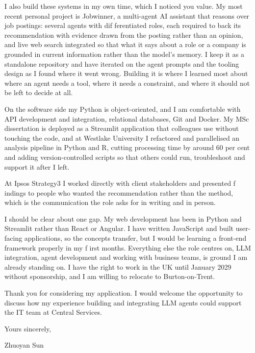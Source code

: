 \documentclass[letterpaper,11pt]{article}
\begin{document}
I also build these systems in my own time, which I noticed you value. My most recent personal project is Jobwinner, a multi-agent AI assistant that reasons over job postings: several agents with dif\kern0pt ferentiated roles, each required to back its recommendation with evidence drawn from the posting rather than an opinion, and live web search integrated so that what it says about a role or a company is grounded in current information rather than the model's memory. I keep it as a standalone repository and have iterated on the agent prompts and the tooling design as I found where it went wrong. Building it is where I learned most about where an agent needs a tool, where it needs a constraint, and where it should not be left to decide at all.

On the software side my Python is object-oriented, and I am comfortable with API development and integration, relational databases, Git and Docker. My MSc dissertation is deployed as a Streamlit application that colleagues use without touching the code, and at Westlake University I refactored and parallelised an analysis pipeline in Python and R, cutting processing time by around 60 per cent and adding version-controlled scripts so that others could run, troubleshoot and support it after I left.

At Ipsos Strategy3 I worked directly with client stakeholders and presented f\kern0pt indings to people who wanted the recommendation rather than the method, which is the communication the role asks for in writing and in person.

I should be clear about one gap. My web development has been in Python and Streamlit rather than React or Angular. I have written JavaScript and built user-facing applications, so the concepts transfer, but I would be learning a front-end framework properly in my f\kern0pt irst months. Everything else the role centres on, LLM integration, agent development and working with business teams, is ground I am already standing on. I have the right to work in the UK until January 2029 without sponsorship, and I am willing to relocate to Burton-on-Trent.

Thank you for considering my application. I would welcome the opportunity to discuss how my experience building and integrating LLM agents could support the IT team at Central Services.

\vspace{2pt}
Yours sincerely,

\vspace{8pt}
Zhuoyan Sun
\end{document}
